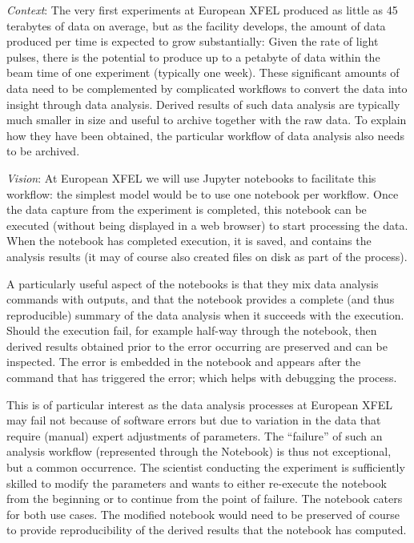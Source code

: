\begin{task}[
  title=Reproducible X-ray crystallography workflows at European XFEL,
  id=reproducibility-xfel,
  lead=XFEL,
  PM=36,
  wphases={6-48},
  partners={XFEL}
  ]
  \medskip \emph{Context}: The very first experiments at European XFEL
  produced as little as 45 terabytes of data on average, but as the
  facility develops, the amount of data produced per time is expected
  to grow substantially: Given the rate of light pulses, there is the
  potential to produce up to a petabyte of data within the beam time
  of one experiment (typically one week). These significant amounts of
  data need to be complemented by complicated workflows to convert the
  data into insight through data analysis. Derived results of such
  data analysis are typically much smaller in size and useful to
  archive together with the raw data. To explain how they have been
  obtained, the particular workflow of data analysis also needs to be
  archived.

  \medskip \emph{Vision}: At European XFEL we will use Jupyter notebooks to facilitate
  this workflow: the simplest model would be to use one notebook per
  workflow. Once the data capture from the experiment is completed,
  this notebook can be executed (without being displayed in a web
  browser) to start processing the data. When the notebook has
  completed execution, it is saved, and contains the analysis results
  (it may of course also created files on disk as part of the
  process).

  A particularly useful aspect of the notebooks is that they mix data
  analysis commands with outputs, and that the notebook provides a
  complete (and thus reproducible) summary of the data analysis when
  it succeeds with the execution. Should the execution fail, for
  example half-way through the notebook, then derived results obtained
  prior to the error occurring are preserved and can be inspected. The
  error is embedded in the notebook and appears after the command that
  has triggered the error; which helps with debugging the process.

  This is of particular interest as the data analysis processes at
  European XFEL may fail not because of software errors but due to
  variation in the data that require (manual) expert adjustments of
  parameters. The ``failure'' of such an analysis workflow
  (represented through the Notebook) is thus not exceptional, but a
  common occurrence. The scientist conducting the experiment is
  sufficiently skilled to modify the parameters and wants to either
  re-execute the notebook from the beginning or to continue from the
  point of failure. The notebook caters for both use cases. The
  modified notebook would need to be preserved of course to provide
  reproducibility of the derived results that the notebook has
  computed.


\end{task}
